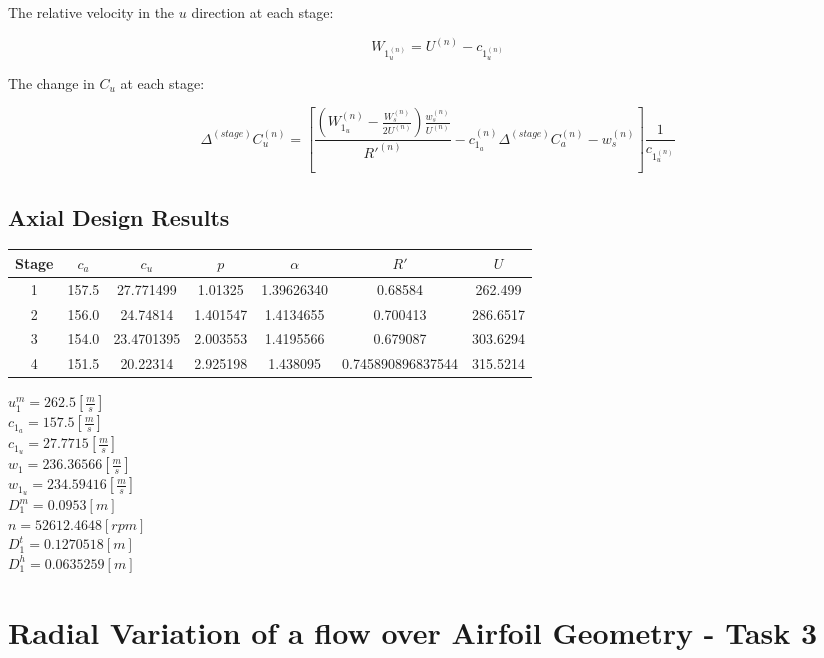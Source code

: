 \documentclass[titlepage]{article}
\begin{document}
The relative velocity in the $u$ direction at each stage:

\begin{equation}
    W_{1_{u}^{(n)}} = U^{(n)} - c_{1_{u}^{(n)}}
\end{equation}

The change in $C_{u}$ at each stage:

\begin{equation}
    \Delta^{(stage)} C_{u}^{(n)} = \left[ \frac{\left( W_{1_{u}}^{(n)} - \frac{W_{s}^{(n)}}{2U^{(n)}}\right) \frac{w_{s}^{(n)}}{U^{(n)}}}{R'^{(n)}}  - c_{1_{a}}^{(n)} \Delta^{(stage)} C_{a}^{(n)} - w_{s}^{(n)} \right] \frac{1}{c_{1_{u}^{(n)}}}
\end{equation}

\subsection{Axial Design Results}

\begin{center} 
    \begin{tabular}{|c|c|c|c|c|c|c|}
        \hline
        Stage & $c_{a}$ & $c_{u}$ & $p$ & $\alpha$ & $R'$ & $U$ \\
        \hline
        1 & 157.5 & 27.771499 & 1.01325 & 1.39626340 & 0.68584 & 262.499 \\
        \hline
        2 & 156.0 & 24.74814 & 1.401547 & 1.4134655 & 0.700413 & 286.6517 \\
        \hline
        3 & 154.0 & 23.4701395 & 2.003553 & 1.4195566 & 0.679087 & 303.6294 \\
        \hline
        4 & 151.5 & 20.22314 & 2.925198 & 1.438095 & 0.745890896837544 & 315.5214 \\
        \hline
        
    \end{tabular}
\end{center}

\vspace*{1cm}

\begin{center} 
    $u_{1}^{m} = 262.5 [\frac{m}{s}]$ \\
    $c_{1_{a}} = 157.5 [\frac{m}{s}]$ \\
    $c_{1_{u}} = 27.7715 [\frac{m}{s}]$ \\
    $w_{1} = 236.36566 [\frac{m}{s}]$ \\
    $w_{1_{u}} = 234.59416 [\frac{m}{s}]$ \\
    $D_{1}^{m} = 0.0953 [m]$ \\
    $n = 52612.4648 [rpm]$ \\
    $D_{1}^{t} = 0.1270518 [m]$ \\
    $D_{1}^{h} = 0.0635259 [m]$ \\
\end{center}


\section{Radial Variation of a flow over Airfoil Geometry - Task 3}








  
\end{document}
